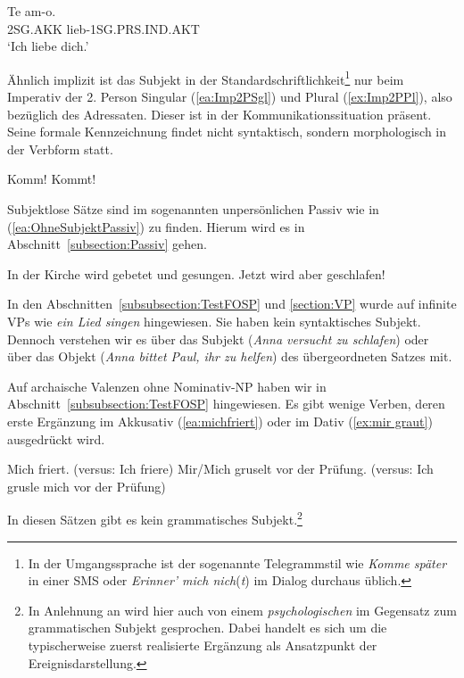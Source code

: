 \ea \label{ea:SpanischProDrop}
\gll Te am-o. \\
     2SG.AKK lieb-1SG.PRS.IND.AKT\\
 \glt ‘Ich liebe dich.’    
\z 

Ähnlich implizit ist das Subjekt in der Standardschriftlichkeit\footnote{In der Umgangssprache ist der sogenannte Telegrammstil wie \textit{Komme später} in einer SMS oder \textit{Erinner' mich nich}(\textit{t}) im Dialog durchaus üblich.} nur beim Imperativ der 2. Person Singular (\ref{ea:Imp2PSgl}) und Plural (\ref{ex:Imp2PPl}), also bezüglich des Adressaten. Dieser ist in der Kommunikationssituation präsent. Seine formale Kennzeichnung findet nicht syntaktisch, sondern morphologisch in der Verbform statt.

\ea \label{ea:Imperativ2P}
\ea \label{ea:Imp2PSgl} Komm!
\ex \label{ex:Imp2PPl} Kommt!
\z 
\z 

Subjektlose Sätze sind im sogenannten unpersönlichen Passiv wie in (\ref{ea:OhneSubjektPassiv}) zu finden. Hierum wird es in Abschnitt~\ref{subsection:Passiv} gehen. 

\ea \label{ea:OhneSubjektPassiv}
\ea \label{ea:UnpPassiv} In der Kirche wird gebetet und gesungen.
\ex \label{ex:UnpPassivImp} Jetzt wird aber geschlafen!
\z 
\z 


In den Abschnitten~\ref{subsubsection:TestFOSP} und \ref{section:VP} wurde auf infinite VPs wie \textit{ein Lied singen} hingewiesen. Sie haben kein syntaktisches Subjekt. Dennoch verstehen wir es über das Subjekt (\textit{Anna versucht zu schlafen}) oder über das Objekt (\textit{Anna bittet Paul, ihr zu helfen}) des übergeordneten Satzes mit. 

Auf archaische Valenzen ohne Nominativ-NP haben wir in Abschnitt~\ref{subsubsection:TestFOSP} hingewiesen. Es gibt wenige Verben, deren erste Ergänzung im Akkusativ (\ref{ea:michfriert}) oder im Dativ (\ref{ex:mir graut}) ausgedrückt wird. 

\ea \label{ea:KeinSubjekt}
\ea \label{ea:michfriert} Mich friert. (versus: Ich friere)
\ex \label{ex:mir graut} Mir/Mich gruselt vor der Prüfung. (versus: Ich grusle mich vor der Prüfung)
\z 
\z 

In diesen Sätzen gibt es kein grammatisches Subjekt.\footnote{In Anlehnung an \citet[124]{Paul1880} wird hier auch von einem \textit{psychologischen} im Gegensatz zum grammatischen Subjekt gesprochen. Dabei handelt es sich um die typischerweise zuerst realisierte Ergänzung als Ansatzpunkt der Ereignisdarstellung.}


